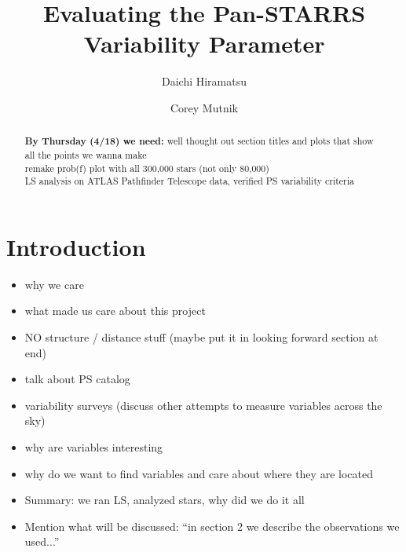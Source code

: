\documentclass[aps,prl,twocolumn,superscriptaddress]{revtex4-1}
\begin{document}
\title{Evaluating the Pan-STARRS Variability Parameter}


\author{Daichi Hiramatsu}
\author{Corey Mutnik}



\begin{abstract}
\textbf{By Thursday (4/18) we need:} well thought out section titles and plots that show all the points we wanna make\\

remake prob(f) plot with all 300,000 stars (not only 80,000)\\

LS analysis on ATLAS Pathfinder Telescope data, verified PS variability criteria
\end{abstract}

\maketitle    




\section{Introduction}

\begin{itemize}
	\item{} why we care
	\item{} what made us care about this project
	\item{} NO structure / distance stuff (maybe put it in looking forward section at end)
	\item{} talk about PS catalog
	\item{} variability surveys (discuss other attempts to measure variables across the sky)
	\item{} why are variables interesting
	\item{} why do we want to find variables and care about where they are located
	\item{} Summary: we ran LS, analyzed stars, why did we do it all
	\item{} Mention what will be discussed: ``in section 2 we describe the observations we used...''
\end{itemize}
\end{document}
